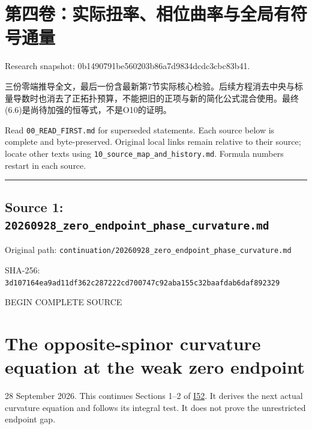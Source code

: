 \documentclass[
  10pt,
]{article}
\author{}
\date{}
\begin{document}
\hypertarget{ux7b2cux56dbux5377ux5b9eux9645ux626dux7387ux76f8ux4f4dux66f2ux7387ux4e0eux5168ux5c40ux6709ux7b26ux53f7ux901aux91cf}{%
\section{第四卷：实际扭率、相位曲率与全局有符号通量}\label{ux7b2cux56dbux5377ux5b9eux9645ux626dux7387ux76f8ux4f4dux66f2ux7387ux4e0eux5168ux5c40ux6709ux7b26ux53f7ux901aux91cf}}

Research snapshot: 0b1490791be560203b86a7d9834dcdc3cbc83b41.

三份零端推导全文，最后一份含最新第7节实际核心检验。后续方程消去中央与标量导数时也消去了正拓扑预算，不能把旧的正项与新的简化公式混合使用。最终(6.6)是尚待加强的恒等式，不是O10的证明。

Read \nolinkurl{00_READ_FIRST.md} for superseded statements. Each source below is
complete and byte-preserved. Original local links remain relative to
their source; locate other texts using \nolinkurl{10_source_map_and_history.md}.
Formula numbers restart in each source.

\begin{center}\rule{0.5\linewidth}{0.5pt}\end{center}

\hypertarget{source-1-20260928_zero_endpoint_phase_curvature.md}{%
\subsection{Source 1:
\nolinkurl{20260928_zero_endpoint_phase_curvature.md}}\label{source-1-20260928_zero_endpoint_phase_curvature.md}}

Original path:
\nolinkurl{continuation/20260928_zero_endpoint_phase_curvature.md}

SHA-256:
\nolinkurl{3d107164ea9ad11df362c287222cd700747c92aba155c32baafdab6daf892329}

BEGIN COMPLETE SOURCE

\hypertarget{the-opposite-spinor-curvature-equation-at-the-weak-zero-endpoint}{%
\section{The opposite-spinor curvature equation at the weak zero
endpoint}\label{the-opposite-spinor-curvature-equation-at-the-weak-zero-endpoint}}

28 September 2026. This continues Sections 1--2 of
\href{20260927_endpoint_covariance_and_surgery_limits.md}{I52}. It
derives the next actual curvature equation and follows its integral
test. It does not prove the unrestricted endpoint gap.
\end{document}
